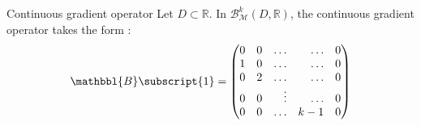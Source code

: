         \begin{exemplebox}{Continuous gradient operator}
            Let $D \subset \mathbb{R}$. In $\mathcal{B}_{\mathcal{M}}^k(D, \mathbb{R})$, the continuous gradient operator takes the form :
            \begin{equation}
                \begin{aligned}
                    \mathbbl{B}\subscript{1} =
                    \begin{pmatrix}
                        \begin{aligned}
                            0 && 0 && \dots && \dots && 0
                            \\
                            1 && 0 && \dots && \dots && 0
                            \\
                            0 && 2 && \dots && \dots && 0
                            \\
                            0 && 0 && \vdots && \dots && 0
                            \\
                            0 && 0 && \dots && k-1 && 0
                        \end{aligned}
                    \end{pmatrix}
                \end{aligned}
            \end{equation}


\end{exemplebox}
